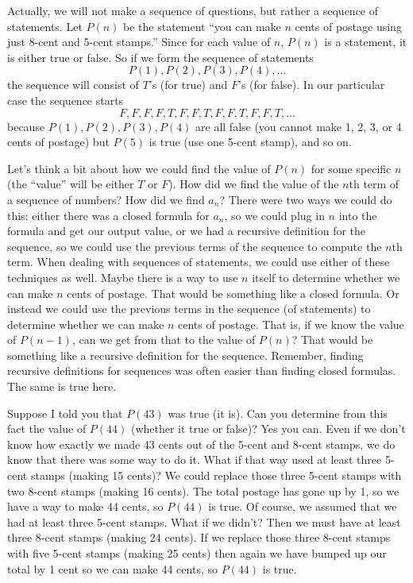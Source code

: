 \documentclass[10pt,]{book}
\theoremstyle{plain}
\theoremstyle{definition}
\theoremstyle{definition}
\theoremstyle{definition}
\numberwithin{equation}{chapter}
\begin{document}
Actually, we will not make a sequence of questions, but rather a sequence of statements. Let \(P(n)\)\label{notation-11}
 be the statement ``you can make \(n\) cents of postage using just 8-cent and 5-cent stamps.'' Since for each value of \(n\), \(P(n)\) is a statement, it is either true or false. So if we form the sequence of statements
\begin{equation*}
  P(1), P(2), P(3), P(4), \ldots
\end{equation*}
the sequence will consist of \(T\)'s (for true) and \(F\)'s (for false). In our particular case the sequence starts
\begin{equation*}
  F,F,F,F,T,F,F,T,F,F,T,F,F,T,\ldots
\end{equation*}
because \(P(1), P(2), P(3), P(4)\) are all false (you cannot make 1, 2, 3, or 4 cents of postage) but \(P(5)\) is true (use one 5-cent stamp), and so on.
%
\par

Let's think a bit about how we could find the value of \(P(n)\) for some specific \(n\) (the ``value'' will be either \(T\) or \(F\)). How did we find the value of the \(n\)th term of a sequence of numbers? How did we find \(a_n\)? There were two ways we could do this: either there was a closed formula for \(a_n\), so we could plug in \(n\) into the formula and get our output value, or we had a recursive definition for the sequence, so we could use the previous terms of the sequence to compute the \(n\)th term. When dealing with sequences of statements, we could use either of these techniques as well. Maybe there is a way to use \(n\) itself to determine whether we can make \(n\) cents of postage. That would be something like a closed formula. Or instead we could use the previous terms in the sequence (of statements) to determine whether we can make \(n\) cents of postage. That is, if we know the value of \(P(n-1)\), can we get from that to the value of \(P(n)\)? That would be something like a recursive definition for the sequence. Remember, finding recursive definitions for sequences was often easier than finding closed formulas. The same is true here.
%
\par

Suppose I told you that \(P(43)\) was true (it is). Can you determine from this fact the value of \(P(44)\) (whether it true or false)? Yes you can. Even if we don't know how exactly we made 43 cents out of the 5-cent and 8-cent stamps, we do know that there was some way to do it. What if that way used at least three 5-cent stamps (making 15 cents)? We could replace those three 5-cent stamps with two 8-cent stamps (making 16 cents). The total postage has gone up by 1, so we have a way to make 44 cents, so \(P(44)\) is true. Of course, we assumed that we had at least three 5-cent stamps. What if we didn't? Then we must have at least three 8-cent stamps (making 24 cents). If we replace those three 8-cent stamps with five 5-cent stamps (making 25 cents) then again we have bumped up our total by 1 cent so we can make 44 cents, so \(P(44)\) is true.
%
\par
\end{document}
